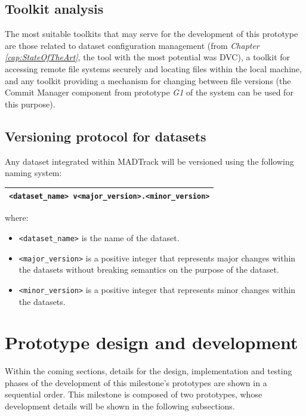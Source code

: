 \subsection{Toolkit analysis}

The most suitable toolkits that may serve for the development of this prototype are those related to dataset configuration management (from \emph{Chapter \ref{cap:StateOfTheArt}},
the tool with the most potential was DVC), a toolkit for accessing remote file systems securely and locating files within the local machine, and any toolkit providing a 
mechanism for changing between file versions (the Commit Manager component from prototype \emph{G1} of the system can be used for this purpose).

\subsection{Versioning protocol for datasets}\label{sec:versioningProtocol}

Any dataset integrated within MADTrack will be versioned using the following naming system:

\begin{table}[H]
    \centering
    \begin{tabular}{|c|}
        \hline
        \texttt{<dataset\_name> v<major\_version>.<minor\_version>} \\ \hline
    \end{tabular}
\end{table}

where:

\begin{itemize}
    \item \texttt{<dataset\_name>} is the name of the dataset.
    \item \texttt{<major\_version>} is a positive integer that represents major changes within the datasets without breaking semantics on the purpose of the dataset.
    \item \texttt{<minor\_version>} is a positive integer that represents minor changes within the datasets.
\end{itemize}

\section{Prototype design and development}

Within the coming sections, details for the design, implementation and testing phases of the development of this milestone's prototypes are shown in a sequential order. This
milestone is composed of two prototypes, whose development details will be shown in the following subsections.

